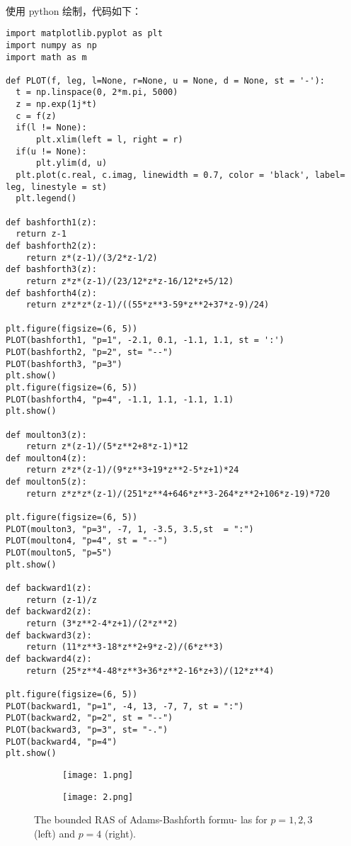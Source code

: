 \documentclass[lang=cn,a4paper,newtx,bibend=bibtex]{elegantpaper}
\begin{document}
\begin{solution}~~\\
使用 python 绘制，代码如下：
\begin{verbatim}
import matplotlib.pyplot as plt 
import numpy as np 
import math as m 

def PLOT(f, leg, l=None, r=None, u = None, d = None, st = '-'):
  t = np.linspace(0, 2*m.pi, 5000)
  z = np.exp(1j*t)
  c = f(z)
  if(l != None):
      plt.xlim(left = l, right = r)
  if(u != None):
      plt.ylim(d, u)
  plt.plot(c.real, c.imag, linewidth = 0.7, color = 'black', label= leg, linestyle = st)
  plt.legend()
  
def bashforth1(z):
  return z-1
def bashforth2(z):
    return z*(z-1)/(3/2*z-1/2)
def bashforth3(z):
    return z*z*(z-1)/(23/12*z*z-16/12*z+5/12)
def bashforth4(z):
    return z*z*z*(z-1)/((55*z**3-59*z**2+37*z-9)/24) 

plt.figure(figsize=(6, 5))
PLOT(bashforth1, "p=1", -2.1, 0.1, -1.1, 1.1, st = ':')
PLOT(bashforth2, "p=2", st= "--")
PLOT(bashforth3, "p=3")
plt.show()
plt.figure(figsize=(6, 5))
PLOT(bashforth4, "p=4", -1.1, 1.1, -1.1, 1.1)
plt.show()

def moulton3(z):
    return z*(z-1)/(5*z**2+8*z-1)*12
def moulton4(z):
    return z*z*(z-1)/(9*z**3+19*z**2-5*z+1)*24
def moulton5(z):
    return z*z*z*(z-1)/(251*z**4+646*z**3-264*z**2+106*z-19)*720

plt.figure(figsize=(6, 5))
PLOT(moulton3, "p=3", -7, 1, -3.5, 3.5,st  = ":")
PLOT(moulton4, "p=4", st = "--")
PLOT(moulton5, "p=5")
plt.show()

def backward1(z):
    return (z-1)/z
def backward2(z):
    return (3*z**2-4*z+1)/(2*z**2)
def backward3(z):
    return (11*z**3-18*z**2+9*z-2)/(6*z**3)
def backward4(z):
    return (25*z**4-48*z**3+36*z**2-16*z+3)/(12*z**4)

plt.figure(figsize=(6, 5))
PLOT(backward1, "p=1", -4, 13, -7, 7, st = ":")
PLOT(backward2, "p=2", st = "--")
PLOT(backward3, "p=3", st= "-.")
PLOT(backward4, "p=4")
plt.show()
\end{verbatim}
\end{solution}

\begin{figure}[H]
  \centering
  \begin{subfigure}[b]{0.45\textwidth}
      \texttt{[image: 1.png]}
  \end{subfigure}
  \hfill
  \begin{subfigure}[b]{0.45\textwidth}
      \texttt{[image: 2.png]}
  \end{subfigure}
  \caption{The bounded RAS of Adams-Bashforth formu-
  las for $p = 1, 2, 3$ (left) and $p = 4$ (right).}
\end{figure}
\end{document}
